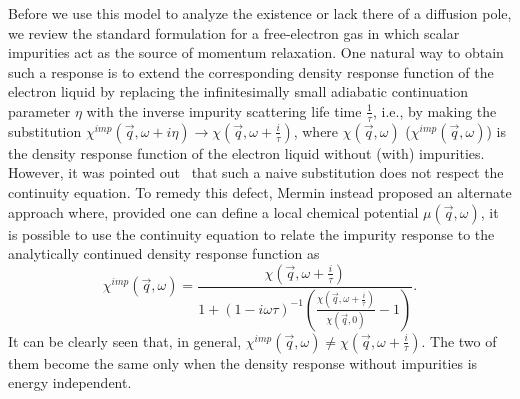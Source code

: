 \documentclass[prl,aps,twocolumn,groupaddress]{revtex4-1}
\begin{document}
Before we use this model to analyze the existence or lack there of a diffusion pole, we review the standard formulation for a free-electron gas in which scalar impurities act as the source of momentum relaxation. One natural way to obtain such a response is to extend the corresponding density response function of the electron liquid by replacing the infinitesimally small adiabatic continuation parameter $\eta$ with the inverse impurity scattering life time $\frac{1}{\tau}$, i.e., by making the substitution $\chi^{imp}(\vec q, \omega + i\eta) \rightarrow \chi(\vec q, \omega + \frac{i}{\tau})$, where $\chi(\vec q, \omega)$ ($\chi^{imp}(\vec q, \omega)$) is the density response function of the electron liquid without (with) impurities. However, it was pointed out~\cite{mermin1970lindhard} that such a naive substitution does not respect the continuity equation. %
 To remedy this defect, Mermin instead proposed an alternate approach where, provided one can define a local chemical potential $\mu(\vec q,\omega)$, it is possible to use the continuity equation to relate the impurity response to the analytically continued density response function as
\begin{equation}
\chi^{imp}(\vec q, \omega) = \frac{\chi(\vec q, \omega + \frac{i}{\tau})}{1+ (1- i \omega \tau)^{-1}\left( \frac{\chi(\vec q, \omega + \frac{i}{\tau})}{\chi(\vec q, 0)}-1 \right)}.
\label{Eq:ImpurityResponse}
\end{equation}   
It can be clearly seen that, in general, $\chi^{imp}(\vec q, \omega ) \neq \chi(\vec q, \omega + \frac{i}{\tau})$. The two of them become the same only when the density response without impurities is energy independent.  \\ \newline
\end{document}

